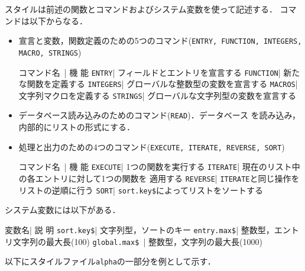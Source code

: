 スタイルは前述の関数とコマンドおよびシステム変数を使って記述する．
コマンドは以下からなる．
\begin{itemize}
\item 宣言と変数，関数定義のための5つのコマンド({\tt ENTRY, FUNCTION, INTEGERS,
MACRO, STRINGS})

\begin{table}[h]
\begintable
{\dg コマンド名}\ | {\dg 機\hskip2cm 能}\hfil\crthick
{\tt ENTRY}\hfill | フィールドとエントリを宣言する\hfill\cr
{\tt FUNCTION}\hfill | 新たな関数を定義する\hfill\cr
{\tt INTEGERS}\hfill | グローバルな整数型の変数を宣言する\hfill\cr
{\tt MACROS}\hfill | 文字列マクロを定義する\hfill\cr
{\tt STRINGS}\hfill | グローバルな文字列型の変数を宣言する\hfill\endtable
\end{table}

\item データベース読み込みのためのコマンド({\tt READ})．データベース
を読み込み，内部的にリストの形式にする．
\newpage
\item 処理と出力のための4つのコマンド({\tt EXECUTE, ITERATE, REVERSE, SORT})

\begin{table}[h]
\begintable
{\dg コマンド名}\ | {\dg 機\hskip2cm 能}\hfil\crthick
{\tt EXECUTE}\hfill | 1つの関数を実行する\hfill\cr
{\tt ITERATE}\hfill | 現在のリスト中の各エントリに対して1つの関数を
適用する\hfill\cr
{\tt REVERSE}\hfill | {\tt ITERATE}と同じ操作をリストの逆順に行う\hfill\cr
{\tt SORT}\hfill | {\tt sort.key\$}によってリストをソートする\hfill\endtable
\end{table}
\end{itemize}

システム変数には以下がある．
\begin{table}[h]
\begintable
{\dg 変数名}| {\dg 説\hskip2cm 明}\hfil\crthick
{\tt sort.key\$}\hfill | 文字列型，ソートのキー\hfill\cr
{\tt entry.max\$}\hfill | 整数型，エントリ文字列の最大長(100)\hfill\cr
{\tt global.max\$\ }\hfill | 整数型，文字列の最大長(1000)\hfill\endtable
\end{table}

以下にスタイルファイル{\tt alpha}の一部分を例として示す．

